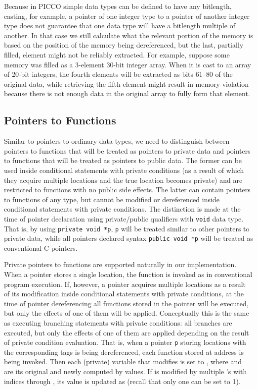 \documentclass[11pt]{article}
\begin{document}
Because in PICCO simple data types can be defined to
have any bitlength, casting, for example, a pointer of one integer type to a
pointer of another integer type does not guarantee that one data type will
have a bitlength multiple of another. In that case we still calculate what
the relevant portion of the memory is based on the position of the memory
being dereferenced, but the last, partially filled, element might not be
reliably extracted. For example, suppose some memory was filled as a
3-element 30-bit integer array. When it is cast to an array of 20-bit
integers, the fourth elements will be extracted as bits 61--80 of the
original data, while retrieving the fifth element might result in memory
violation because there is not enough data in the original array to fully
form that element.

\subsection{Pointers to Functions}

Similar to pointers to ordinary data types, we need to distinguish between
pointers to functions that will be treated as pointers to private data and
pointers to functions that will be treated as pointers to public data. The
former can be used inside conditional statements with private conditions (as
a result of which they acquire multiple locations and the true location
becomes private) and are restricted to functions with no public side
effects. The latter can contain pointers to functions of any type, but
cannot be modified or dereferenced inside conditional statements with
private conditions. The distinction is made at the time of pointer
declaration using private/public qualifiers with \texttt{void} data type.
That is, by using \texttt{private void *p}, \texttt{p} will be treated
similar to other pointers to private data, while all pointers declared
syntax \texttt{public void *p} will be treated as conventional C pointers.

Private pointers to functions are supported naturally in our implementation.
When a pointer stores a single location, the function is invoked as in
conventional program execution. If, however, a pointer acquires multiple
locations as a result of its modification inside conditional statements with
private conditions, at the time of pointer dereferencing all functions
stored in the pointer will be executed, but only the effects of one of them
will be applied. Conceptually this is the same as executing branching
statements with private conditions: all branches are executed, but only the
effects of one of them are applied depending on the result of private
condition evaluation. That is, when a pointer \texttt{p} storing 
locations  with the corresponding tags  is being dereferenced, each function  stored
at address  is being invoked. Then each (private) variable  that
 modifies is set to , where
 and  are its original and newly computed by  values. If
 is modified by multiple 's with indices  through ,
its value is updated as  (recall that only one  can be set to
1).
\end{document}
